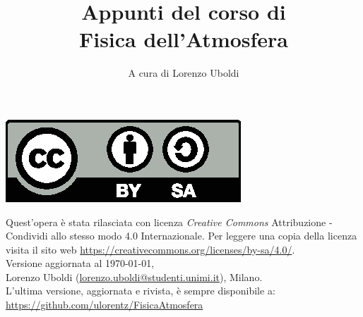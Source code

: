 \documentclass[A4paper, 11pt]{book}
\title{Appunti del corso di 
	\\ \Huge Fisica dell'Atmosfera}
\author{A cura di Lorenzo Uboldi}
\begin{document}
\frontmatter
\maketitle

	
\null %
\vfill %
\hspace*{-1.5em}\includegraphics[scale=.7]{figures/by-sa.eps}
\begin{flushleft}
	Quest'opera è stata rilasciata con licenza \emph{Creative Commons} Attribuzione - Condividi allo stesso modo 4.0 Internazionale. Per leggere una copia della licenza visita il sito web \url{https://creativecommons.org/licenses/by-sa/4.0/}.\\[1cm]
	Versione aggiornata al \today,\\
	Lorenzo Uboldi (\href{mailto:lorenzo.uboldi@studenti.unimi.it}{\ttfamily lorenzo.uboldi@studenti.unimi.it}), Milano.\\[0.2cm]
	L'ultima versione, aggiornata e rivista, è sempre disponibile a: \url{https://github.com/ulorentz/FisicaAtmosfera}
	
\end{flushleft}

\cleardoublepage

\tableofcontents
\mainmatter

\end{document}
